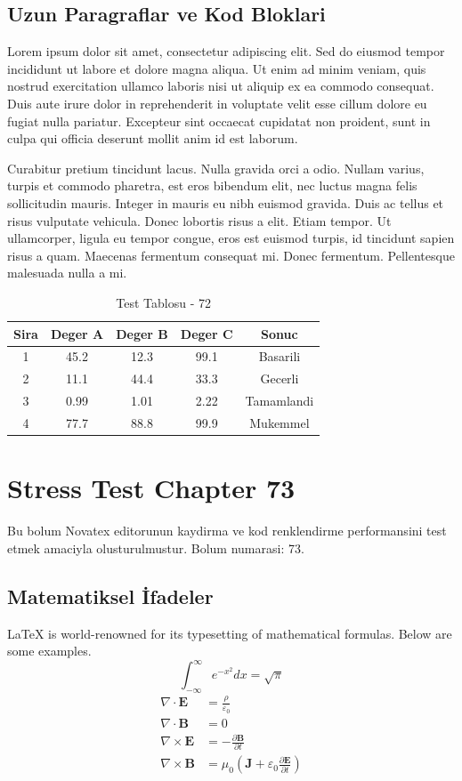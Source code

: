 \documentclass[12pt,a4paper]{article}
\begin{document}
\subsection{Uzun Paragraflar ve Kod Bloklari}
Lorem ipsum dolor sit amet, consectetur adipiscing elit. Sed do eiusmod tempor incididunt ut labore et dolore magna aliqua. Ut enim ad minim veniam, quis nostrud exercitation ullamco laboris nisi ut aliquip ex ea commodo consequat. Duis aute irure dolor in reprehenderit in voluptate velit esse cillum dolore eu fugiat nulla pariatur. Excepteur sint occaecat cupidatat non proident, sunt in culpa qui officia deserunt mollit anim id est laborum.

Curabitur pretium tincidunt lacus. Nulla gravida orci a odio. Nullam varius, turpis et commodo pharetra, est eros bibendum elit, nec luctus magna felis sollicitudin mauris. Integer in mauris eu nibh euismod gravida. Duis ac tellus et risus vulputate vehicula. Donec lobortis risus a elit. Etiam tempor. Ut ullamcorper, ligula eu tempor congue, eros est euismod turpis, id tincidunt sapien risus a quam. Maecenas fermentum consequat mi. Donec fermentum. Pellentesque malesuada nulla a mi.

\begin{table}[h!]
\centering
\begin{tabular}{|c|c|c|c|c|}
\hline
\textbf{Sira} & \textbf{Deger A} & \textbf{Deger B} & \textbf{Deger C} & \textbf{Sonuc} \\
\hline
1 & 45.2 & 12.3 & 99.1 & Basarili \\
2 & 11.1 & 44.4 & 33.3 & Gecerli \\
3 & 0.99 & 1.01 & 2.22 & Tamamlandi \\
4 & 77.7 & 88.8 & 99.9 & Mukemmel \\
\hline
\end{tabular}
\caption{Test Tablosu - 72}
\end{table}

\newpage
\section{Stress Test Chapter 73}
Bu bolum Novatex editorunun kaydirma ve kod renklendirme performansini test etmek amaciyla olusturulmustur. Bolum numarasi: 73.

\subsection{Matematiksel İfadeler}
\LaTeX{} is world-renowned for its typesetting of mathematical formulas. Below are some examples.
\begin{equation}
\int_{-\infty}^{\infty} e^{-x^2} dx = \sqrt{\pi}
\end{equation}
\begin{align}
\nabla \cdot \mathbf{E} &= \frac{\rho}{\varepsilon_0} \\
\nabla \cdot \mathbf{B} &= 0 \\
\nabla \times \mathbf{E} &= -\frac{\partial \mathbf{B}}{\partial t} \\
\nabla \times \mathbf{B} &= \mu_0\left(\mathbf{J} + \varepsilon_0 \frac{\partial \mathbf{E}}{\partial t}\right)
\end{align}
\end{document}
